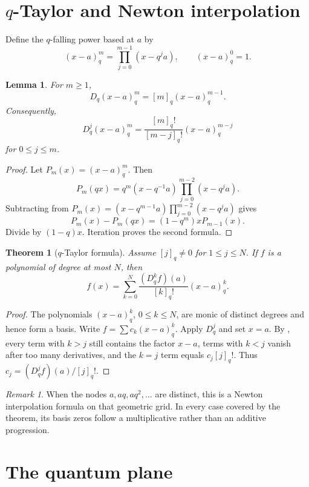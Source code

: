 \documentclass[11pt,a4paper,oneside,openany]{book}
\newtheorem{theorem}{Theorem}[chapter]
\newtheorem{lemma}[lemma]{Lemma}
\theoremstyle{definition}
\theoremstyle{remark}
\newtheorem{remark}[remark]{Remark}
\begin{document}
\section{\texorpdfstring{$q$}{q}-Taylor and Newton interpolation}

Define the $q$-falling power based at $a$ by
\[
 (x-a)_q^m=\prod_{j=0}^{m-1}(x-q^ja),
 \qquad (x-a)_q^0=1.
\]

\begin{lemma}\label{lem:qfalling-derivative}
For $m\ge1$,
\[
 D_q(x-a)_q^m=[m]_q(x-a)_q^{m-1}.
\]
Consequently,
\[
 D_q^j(x-a)_q^m
 =\frac{[m]_q!}{[m-j]_q!}(x-a)_q^{m-j}
\]
for $0\le j\le m$.
\end{lemma}

\begin{proof}
Let $P_m(x)=(x-a)_q^m$.  Then
\[
 P_m(qx)=q^m(x-q^{-1}a)\prod_{j=0}^{m-2}(x-q^ja).
\]
Subtracting from
\(
 P_m(x)=(x-q^{m-1}a)\prod_{j=0}^{m-2}(x-q^ja)
\)
gives
\[
 P_m(x)-P_m(qx)=(1-q^m)xP_{m-1}(x).
\]
Divide by $(1-q)x$.  Iteration proves the second formula.
\end{proof}

\begin{theorem}[$q$-Taylor formula]\label{thm:q-taylor}
Assume $[j]_q\ne0$ for $1\le j\le N$.  If $f$ is a polynomial of degree at most $N$, then
\[
 f(x)=\sum_{k=0}^{N}\frac{(D_q^kf)(a)}{[k]_q!}(x-a)_q^k.
\]
\end{theorem}

\begin{proof}
The polynomials $(x-a)_q^k$, $0\le k\le N$, are monic of distinct degrees and hence form a basis.  Write
\(
 f=\sum c_k(x-a)_q^k.
\)
Apply $D_q^j$ and set $x=a$.  By , every term with $k>j$ still contains the factor $x-a$, terms with $k<j$ vanish after too many derivatives, and the $k=j$ term equals $c_j[j]_q!$.  Thus $c_j=(D_q^jf)(a)/[j]_q!$.
\end{proof}

\begin{remark}
When the nodes $a,aq,aq^2,\ldots$ are distinct, this is a Newton interpolation formula on that geometric grid.  In every case covered by the theorem, its basis zeros follow a multiplicative rather than an additive progression.
\end{remark}

\section{The quantum plane}
\end{document}
